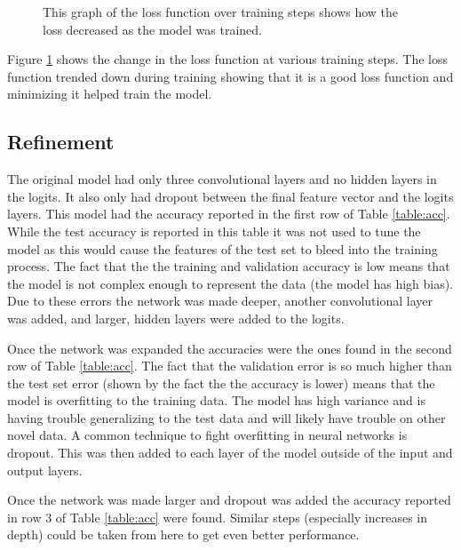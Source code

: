 \documentclass[12pt,twocolumn,letterpaper]{article}
\begin{document}
\begin{figure}[t]
\begin{center}
\end{center}
   \caption{This graph of the loss function over training steps shows how the loss
   decreased as the model was trained.}
\label{fig:loss}
\end{figure} 

Figure \ref{fig:loss} shows 
the change in the loss function at various training steps. The loss function 
trended down during training showing that it is a good loss function and minimizing 
it helped train the model. 
\subsection{Refinement}
The original model had only three convolutional layers and no hidden layers in 
the logits. It also only had dropout between the final feature vector and the 
logits layers. This model had the accuracy reported in the first row of 
Table \ref{table:acc}. While the test accuracy is reported in this table it was not used to 
tune the model as this would cause the features of the test set to bleed into 
the training process. The fact that the the training and validation accuracy is 
low means that the model is not complex enough to represent the data (the model 
has high bias). Due to these errors the network was made deeper, another 
convolutional layer was added, and larger, hidden layers were added to the 
logits. 

Once the network was expanded the accuracies were the ones found in the 
second row of Table \ref{table:acc}. The fact that the validation error is so much higher than 
the test set error (shown by the fact the the accuracy is lower) means that the
model is overfitting to the training data. The model has high variance and is having 
trouble generalizing to the test data and will likely have trouble on other novel 
data. A common technique to fight overfitting in neural networks is dropout. This 
was then added to each layer of the model outside of the input and output layers.

Once the network was made larger and dropout was added the accuracy reported in 
row 3 of Table \ref{table:acc} were found. Similar steps (especially increases in depth) could 
be taken from here to get even better performance.
\end{document}
